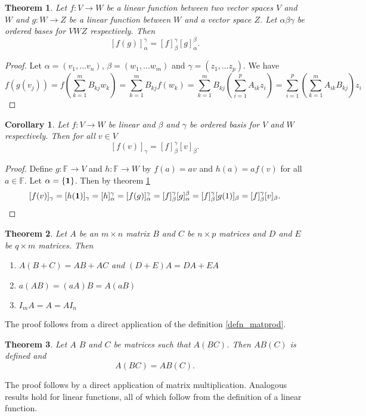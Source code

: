 \documentclass[oneside, 12pt]{book}
\newtheorem{thm}{Theorem}[section]
\newtheorem{cor}{Corollary}[section]
\theoremstyle{definition}
\begin{document}
\begin{thm}
\label{thm_matprod}
  Let $f: V \to W$ be a linear function between two vector spaces $V$ and $W$ and $g: W \to Z$ be a linear function between $W$ and a vector space $Z$. Let $\alpha \beta \gamma$ be ordered bases for $V W Z$ respectively. Then
  \[[f(g)]_{\alpha}^{\gamma}=[f]_{\beta}^{\gamma}[g]_{\alpha}^{\beta}.\]
\end{thm}
\begin{proof}
  Let $\alpha=(v_{1}, \dots v_{n})$, $\beta=(w_{1}, \dots w_{m})$ and $\gamma=(z_{1}, \dots z_{p})$. We have \[f(g(v_{j}))=f(\sum_{k=1}^{m}B_{kj}w_{k})=\sum_{k=1}^{m}B_{kj}f(w_{k})=\sum_{k=1}^{m}B_{kj}(\sum_{i=1}^{p}A_{ik}z_{i})=\sum_{i=1}^{p}(\sum_{k=1}^{m}A_{ik}B_{kj})z_{i}\]
\end{proof}
\begin{cor}
  \label{cor_matapp}
  Let $f: V \to W$ be linear and $\beta$ and $\gamma$ be ordered basis for $V$ and $W$ respectively. Then for all $v \in V$
  \[[f(v)]_{\gamma}=[f]_{\beta}^{\gamma}[v]_{\beta}.\]
\end{cor}
\begin{proof}
Define $g: \mathbb{F} \to V$ and $h: \mathbb{F} \to W$ by $f(a)=av$ and $h(a)=af(v)$ for all $a \in \mathbb{F}$. Let $\alpha=\{\bold{1}\}$. Then by theorem \ref{thm_matprod}
\[[f(v)]_{\gamma}=[h(\bold{1})]_{\gamma}=[h]_{\alpha}^{\gamma}=[f(g)]_{\alpha}^{\gamma}=[f]_{\beta}^{\gamma}[g]_{\alpha}^{\beta}=[f]_{\beta}^{\gamma}[g(1)]_{\beta}=[f]_{\beta}^{\gamma}[v]_{\beta}.\]
\end{proof}

\begin{thm}
\label{thm_matt}
  Let $A$ be an $m \times n$ matrix $B$ and $C$ be $n \times p$ matrices and $D$ and $E$ be $q \times m$ matrices. Then
  \begin{enumerate}
    \item $A(B+C)=AB+AC$ and $(D+E)A=DA+EA$
    \item $a(AB)=(aA)B=A(aB)$
    \item$I_{m}A=A=AI_{n}$
  \end{enumerate}
\end{thm}
The proof follows from a direct application of the definition \ref{defn_matprod}.
\begin{thm}
\label{mat_assc}
  Let $A$ $B$ and $C$ be matrices such that $A(BC)$. Then $AB(C)$ is defined and \[A(BC)=AB(C).\]
\end{thm}
The proof follows by a direct application of matrix multiplication. Analogous results hold for linear functions, all of which follow from the definition of a linear function.
\end{document}

